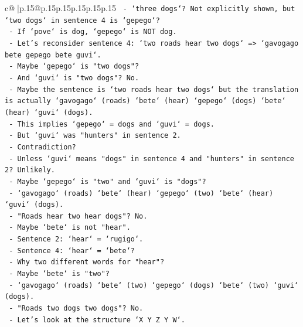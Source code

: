 \documentclass{article}
\begin{document}
{\begin{supertabular}{c@{$\;$}|p{.15\linewidth}@{}p{.15\linewidth}p{.15\linewidth}p{.15\linewidth}p{.15\linewidth}p{.15\linewidth}}
{{{\texttt{                       {-} `three dogs`? Not explicitly shown, but `two dogs` in sentence 4 is `gepego`?} \\
\texttt{                       {-} If `pove` is dog, `gepego` is NOT dog.} \\
\texttt{                 {-} Let's reconsider sentence 4: `two roads hear two dogs` => `gavogago bete gepego bete guvi`.} \\
\texttt{                   {-} Maybe `gepego` is "two dogs"?} \\
\texttt{                   {-} And `guvi` is "two dogs"? No.} \\
\texttt{                   {-} Maybe the sentence is `two roads hear two dogs` but the translation is actually `gavogago` (roads) `bete` (hear) `gepego` (dogs) `bete` (hear) `guvi` (dogs).} \\
\texttt{                   {-} This implies `gepego` = dogs and `guvi` = dogs.} \\
\texttt{                   {-} But `guvi` was "hunters" in sentence 2.} \\
\texttt{                   {-} Contradiction?} \\
\texttt{                   {-} Unless `guvi` means "dogs" in sentence 4 and "hunters" in sentence 2? Unlikely.} \\
\texttt{                   {-} Maybe `gepego` is "two" and `guvi` is "dogs"?} \\
\texttt{                     {-} `gavogago` (roads) `bete` (hear) `gepego` (two) `bete` (hear) `guvi` (dogs).} \\
\texttt{                     {-} "Roads hear two hear dogs"? No.} \\
\texttt{                   {-} Maybe `bete` is not "hear".} \\
\texttt{                     {-} Sentence 2: `hear` = `rugigo`.} \\
\texttt{                     {-} Sentence 4: `hear` = `bete`?} \\
\texttt{                     {-} Why two different words for "hear"?} \\
\texttt{                     {-} Maybe `bete` is "two"?} \\
\texttt{                       {-} `gavogago` (roads) `bete` (two) `gepego` (dogs) `bete` (two) `guvi` (dogs).} \\
\texttt{                       {-} "Roads two dogs two dogs"? No.} \\
\texttt{                   {-} Let's look at the structure `X Y Z Y W`.} \\
}}}
\end{supertabular}}
\end{document}
